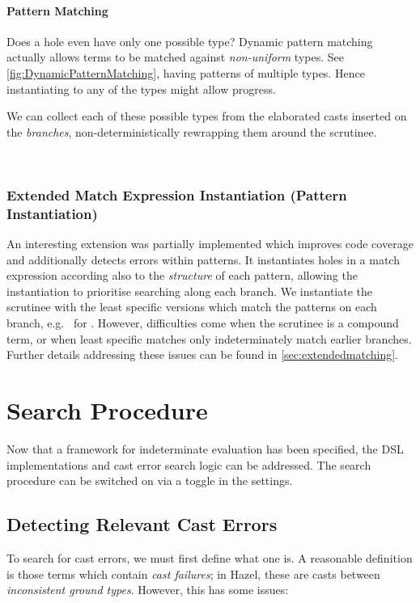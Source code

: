 \paragraph{Pattern Matching}
\label{sec:PatternMatching}
Does a hole even have only one possible type? Dynamic pattern matching actually allows terms to be matched against \textit{non-uniform} types. See \cref{fig:DynamicPatternMatching}, having patterns of multiple types. Hence instantiating to any of the types might allow progress.

We can collect each of these possible types from the elaborated casts inserted on the \textit{branches}, non-deterministically rewrapping them around the scrutinee.
\ 
\par
\ 
\par
\subsubsection{Extended Match Expression Instantiation (Pattern Instantiation)}
\label{sec:ExtendedPatternMatching}
An interesting extension was partially implemented which improves code coverage and additionally detects errors within patterns. It instantiates holes in a match expression according also to the \textit{structure} of each pattern, allowing the instantiation to prioritise searching along each branch. We instantiate the scrutinee with the least specific versions which match the patterns on each branch, e.g. \dyn\code{::}\dyn\ for . However, difficulties come when the scrutinee is a compound term, or when least specific matches only indeterminately match earlier branches. Further details addressing these issues can be found in \cref{sec:extendedmatching}.

\section{Search Procedure}\label{sec:SearchProcedure}
Now that a framework for indeterminate evaluation has been specified, the DSL implementations and cast error search logic can be addressed. The search procedure can be switched on via a toggle in the settings.

\subsection{Detecting Relevant Cast Errors}
\label{sec:CastFailureDetection}
To search for cast errors, we must first define what one is. A reasonable definition is those terms which contain \textit{cast failures}; in Hazel, these are casts between \textit{inconsistent ground types}. However, this has some issues:

